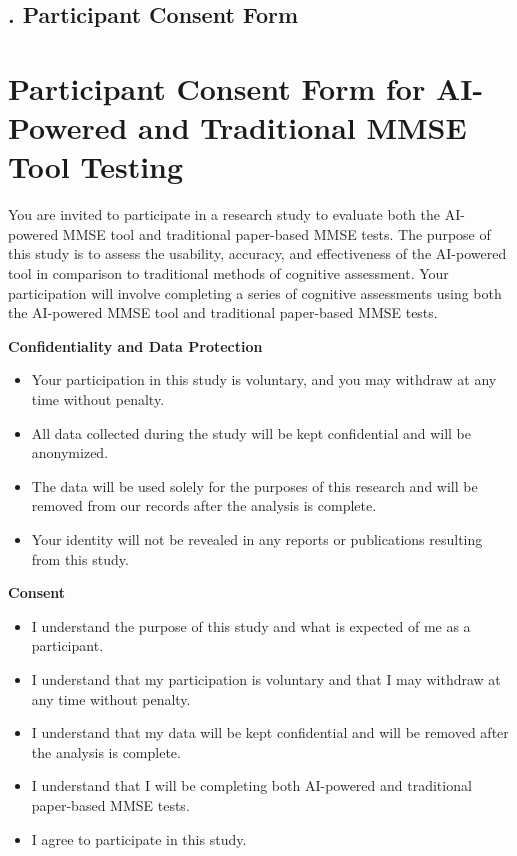 \newpage
{}

\subsection*{. Participant Consent Form} \label{appendix:concent}


\section*{Participant Consent Form for AI-Powered and Traditional MMSE Tool Testing}
\noindent
You are invited to participate in a research study to evaluate both the AI-powered MMSE tool and traditional paper-based MMSE tests. The purpose of this study is to assess the usability, accuracy, and effectiveness of the AI-powered tool in comparison to traditional methods of cognitive assessment. Your participation will involve completing a series of cognitive assessments using both the AI-powered MMSE tool and traditional paper-based MMSE tests.

\vspace{0.5cm}

\noindent
\textbf{Confidentiality and Data Protection}

\begin{itemize}
    \item Your participation in this study is voluntary, and you may withdraw at any time without penalty.
    \item All data collected during the study will be kept confidential and will be anonymized.
    \item The data will be used solely for the purposes of this research and will be removed from our records after the analysis is complete.
    \item Your identity will not be revealed in any reports or publications resulting from this study.
\end{itemize}

\vspace{0.5cm}

\noindent
\textbf{Consent}

\begin{itemize}
    \item I understand the purpose of this study and what is expected of me as a participant.
    \item I understand that my participation is voluntary and that I may withdraw at any time without penalty.
    \item I understand that my data will be kept confidential and will be removed after the analysis is complete.
    \item I understand that I will be completing both AI-powered and traditional paper-based MMSE tests.
    \item I agree to participate in this study.
\end{itemize}

